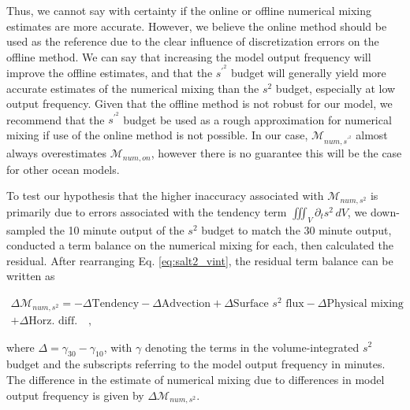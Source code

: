 \documentclass[draft]{agujournal2019}
\begin{document}
Thus, we cannot say with certainty if the online or offline numerical mixing estimates are more accurate. However, we believe the online method should be used as the reference due to the clear influence of discretization errors on the offline method. We can say that increasing the model output frequency will improve the offline estimates, and that the $s^{\prime^2}$ budget will generally yield more accurate estimates of the numerical mixing than the $s^2$ budget, especially at low output frequency. Given that the offline method is not robust for our model, we recommend that the $s^{\prime^2}$ budget be used as a rough approximation for numerical mixing if use of the online method is not possible. In our case, $\mathcal{M}_{num, s^{\prime^2}}$ almost always overestimates $\mathcal{M}_{num, on}$, however there is no guarantee this will be the case for other ocean models.

To test our hypothesis that the higher inaccuracy associated with $\mathcal{M}_{num, s^2}$ is primarily due to errors associated with the tendency term $\iiint_V \partial_t s^2 \, dV$, we down-sampled the 10 minute output of the $s^2$ budget to match the 30 minute output, conducted a term balance on the numerical mixing for each, then calculated the residual. After rearranging Eq. \ref{eq:salt2_vint}, the residual term balance can be written as 
\begin{linenomath*}
\begin{equation} \label{eq:downsampled_termbalance}
    \begin{split}
    \Delta \mathcal{M}_{num, s^2} = -\Delta \textrm{Tendency}-\Delta \textrm{Advection}+\Delta \textrm{Surface $s^2$ flux}-\Delta \textrm{Physical mixing} \\
    + \Delta \textrm{Horz. diff.} \quad ,
    \end{split}
\end{equation}
\end{linenomath*}
where $\Delta = \gamma_{30}-\gamma_{10}$, with $\gamma$ denoting the terms in the volume-integrated $s^2$ budget and the subscripts referring to the model output frequency in minutes. The difference in the estimate of numerical mixing due to differences in model output frequency is given by $\Delta \mathcal{M}_{num, s^2}$. 
\end{document}
